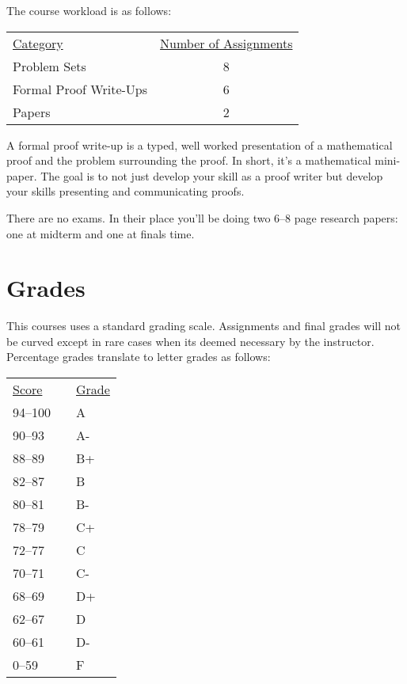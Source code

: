 \documentclass[nobib]{tufte-handout}
\begin{document}
The course workload is as follows:
\begin{center}
  \begin{tabular}{lc}
    \underline{Category} & \underline{Number of Assignments} \\
    Problem Sets & 8 \\
    Formal Proof Write-Ups & 6 \\
    Papers & 2
  \end{tabular}
\end{center}

A formal proof write-up is a typed, well worked presentation of a mathematical proof and the problem surrounding the proof. In short, it's a mathematical mini-paper. The goal is to not just develop your skill as a proof writer but develop your skills presenting and communicating proofs.

There are no exams. In their place you'll be doing two 6--8 page research papers: one at midterm and one at finals time.

\section{Grades}

This courses uses a standard grading scale.  Assignments and final grades will not be curved except in rare cases when its deemed necessary by the instructor.  Percentage grades translate to letter grades as follows:

\begin{center}
\begin{small}
\begin{tabular}{lcl}
\underline{Score} & & \underline{Grade} \\
94--100 & & A \\
90--93 & & A- \\
88--89 & & B+ \\
82--87 & & B \\
80--81 & & B- \\
78--79 & & C+ \\
72--77 & & C \\
70--71 & & C- \\
68--69 & & D+ \\
62--67 & & D \\
60--61 & & D- \\
0--59 & & F
\end{tabular}
\end{small}
\end{center}
\end{document}
